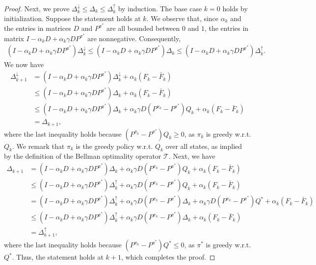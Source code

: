\documentclass[10pt,a4paper]{amsart}
\begin{document}
\begin{proof}
Next, we prove $\Delta^{\downarrow}_k \leq \Delta_k \leq \Delta^{\uparrow}_k$ by induction. The base case $k=0$ holds by initialization. Suppose the statement holds at $k$. We observe that, since $\alpha_k$ and the entries in matrices $D$ and $P^{\pi^*}$ are all bounded between $0$ and $1$, the entries in matrix $I - \alpha_kD + \alpha_k \gamma D P^{\pi^*}$ are nonnegative. Consequently,
\begin{align*}
(I - \alpha_kD + \alpha_k \gamma D P^{\pi^*}) \Delta^{\downarrow}_{k} \leq (I - \alpha_kD + \alpha_k \gamma D P^{\pi^*}) \Delta_{k} \leq (I - \alpha_kD + \alpha_k \gamma D P^{\pi^*}) \Delta^{\uparrow}_{k}.
\end{align*}
We now have
\begin{align*}
\Delta^{\downarrow}_{k+1} &= (I - \alpha_kD + \alpha_k \gamma D P^{\pi^*})\Delta^{\downarrow}_k  + \alpha_k(F_k - \bar{F}_k)\\
&\leq (I - \alpha_kD + \alpha_k \gamma D P^{\pi^*})\Delta_k  + \alpha_k(F_k - \bar{F}_k)\\
&\leq (I - \alpha_kD + \alpha_k \gamma D P^{\pi^*})\Delta_k + \alpha_k \gamma D(P^{\pi_k}-P^{\pi^*} )Q_k  + \alpha_k(F_k - \bar{F}_k)\\
&=\Delta_{k+1},
\end{align*}
where the last inequality holds because $(P^{\pi_k}-P^{\pi^*} )Q_k \geq 0$, as $\pi_k$ is greedy w.r.t. $Q_k$. We remark that $\pi_k$ is the greedy policy w.r.t. $Q_k$ over all states, as implied by the definition of the Bellman optimality operator $\mathcal{T}$. Next, we have
\begin{align*}
\Delta_{k+1} &= (I - \alpha_kD + \alpha_k \gamma D P^{\pi^*})\Delta_k + \alpha_k \gamma D(P^{\pi_k}-P^{\pi^*} )Q_k  + \alpha_k(F_k - \bar{F}_k)\\
&\leq (I - \alpha_kD + \alpha_k \gamma D P^{\pi^*})\Delta^{\uparrow}_k + \alpha_k \gamma D(P^{\pi_k}-P^{\pi^*} )Q_k  + \alpha_k(F_k - \bar{F}_k)\\
&= (I - \alpha_kD + \alpha_k \gamma D P^{\pi^*})\Delta^{\uparrow}_k + \alpha_k \gamma D(P^{\pi_k}-P^{\pi^*} )\Delta_k  + \alpha_k \gamma D(P^{\pi_k}-P^{\pi^*} )Q^* + \alpha_k(F_k - \bar{F}_k)\\
&\leq (I - \alpha_kD + \alpha_k \gamma D P^{\pi^*})\Delta^{\uparrow}_k + \alpha_k \gamma D(P^{\pi_k}-P^{\pi^*} )\Delta_k +\alpha_k(F_k - \bar{F}_k)\\
&= \Delta^{\uparrow}_{k+1},
\end{align*}
where the last inequality holds because $(P^{\pi_k}-P^{\pi^*} )Q^* \leq 0$, as $\pi^*$ is greedy w.r.t. $Q^*$. Thus, the statement holds at $k+1$, which completes the proof.
\end{proof}
\end{document}
